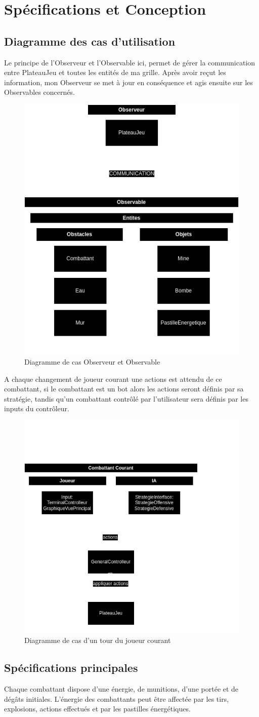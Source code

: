 \documentclass[a4paper,12pt]{article}
\begin{document}
	\section{Spécifications et Conception}
	\subsection{Diagramme des cas d'utilisation}
	Le principe de l'Observeur et l'Observable ici, permet de gérer la communication entre PlateauJeu et toutes les entités de ma grille. Après avoir reçut les information, mon Observeur se met à jour en conséquence et agis ensuite sur les Observables concernés.
	\begin{figure}[h!]
		\centering
		\includegraphics[width=0.3\linewidth]{diag_1}
		\caption{Diagramme de cas Observeur et Observable}
	\end{figure}
	
	A chaque changement de joueur courant une actions est attendu de ce combattant, si le combattant est un bot alors les actions seront définis par sa stratégie, tandis qu'un combattant contrôlé par l'utilisateur sera définis par les inputs du contrôleur.
	\begin{figure}[h!]
		\centering
		\includegraphics[width=0.3\linewidth]{diag_2}
		\caption{Diagramme de cas d'un tour du joueur courant}
	\end{figure}
	
	\subsection{Spécifications principales}
	Chaque combattant dispose d’une énergie, de munitions, d'une portée et de dégâts initiales. 
	L'énergie des combattants peut être affectée par les tirs, explosions, actions effectués et par les pastilles énergétiques.
	
\end{document}
